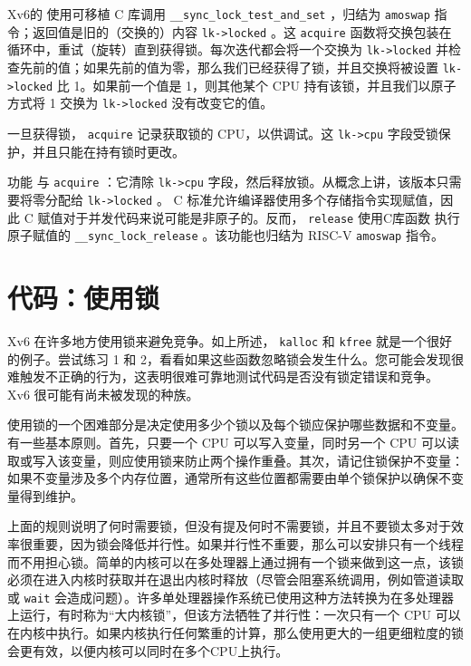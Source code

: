 Xv6的
        使用可移植 C 库调用
    \lstinline{__sync_lock_test_and_set}    ，归结为
    \lstinline{amoswap}    指令；返回值是旧的（交换的）内容
    \lstinline{lk->locked}    。这
    \lstinline{acquire}    函数将交换包装在循环中，重试（旋转）直到获得锁。每次迭代都会将一个交换为
    \lstinline{lk->locked}    并检查先前的值；如果先前的值为零，那么我们已经获得了锁，并且交换将被设置
    \lstinline{lk->locked}    比 1。如果前一个值是 1，则其他某个 CPU 持有该锁，并且我们以原子方式将 1 交换为
    \lstinline{lk->locked}    没有改变它的值。  

一旦获得锁，
    \lstinline{acquire}    记录获取锁的 CPU，以供调试。这
    \lstinline{lk->cpu}    字段受锁保护，并且只能在持有锁时更改。  

功能
        与
    \lstinline{acquire}    ：它清除
    \lstinline{lk->cpu}    字段，然后释放锁。从概念上讲，该版本只需要将零分配给
    \lstinline{lk->locked}    。 C 标准允许编译器使用多个存储指令实现赋值，因此 C 赋值对于并发代码来说可能是非原子的。反而，
    \lstinline{release}   使用C库函数
 执行原子赋值的    \lstinline{__sync_lock_release}   。该功能也归结为 RISC-V
    \lstinline{amoswap}    指令。
    \section{代码：使用锁  }    Xv6 在许多地方使用锁来避免竞争。如上所述，
    \lstinline{kalloc}   
        和
    \lstinline{kfree}   
        就是一个很好的例子。尝试练习 1 和 2，看看如果这些函数忽略锁会发生什么。您可能会发现很难触发不正确的行为，这表明很难可靠地测试代码是否没有锁定错误和竞争。 Xv6 很可能有尚未被发现的种族。  

使用锁的一个困难部分是决定使用多少个锁以及每个锁应保护哪些数据和不变量。有一些基本原则。首先，只要一个 CPU 可以写入变量，同时另一个 CPU 可以读取或写入该变量，则应使用锁来防止两个操作重叠。其次，请记住锁保护不变量：如果不变量涉及多个内存位置，通常所有这些位置都需要由单个锁保护以确保不变量得到维护。  

上面的规则说明了何时需要锁，但没有提及何时不需要锁，并且不要锁太多对于效率很重要，因为锁会降低并行性。如果并行性不重要，那么可以安排只有一个线程而不用担心锁。简单的内核可以在多处理器上通过拥有一个锁来做到这一点，该锁必须在进入内核时获取并在退出内核时释放（尽管会阻塞系统调用，例如管道读取或
    \lstinline{wait}    会造成问题）。许多单处理器操作系统已使用这种方法转换为在多处理器上运行，有时称为“大内核锁”，但该方法牺牲了并行性：一次只有一个 CPU 可以在内核中执行。如果内核执行任何繁重的计算，那么使用更大的一组更细粒度的锁会更有效，以便内核可以同时在多个CPU上执行。  

